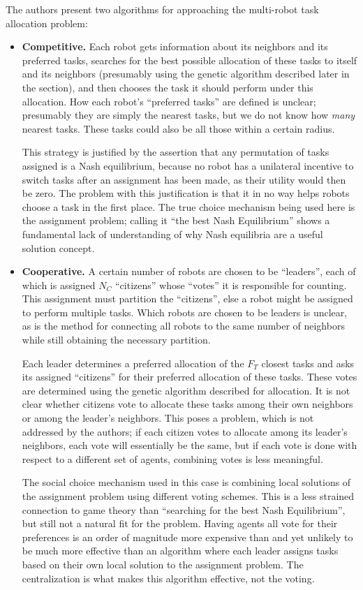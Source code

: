 \documentclass[11pt]{article}
\begin{document}
The authors present two algorithms for approaching the multi-robot task allocation problem:
\begin{flushleft}
\begin{itemize}
\item \textbf{Competitive.} Each robot gets information about its neighbors and its preferred tasks, searches for the best possible allocation of these tasks to itself and its neighbors (presumably using the genetic algorithm described later in the section), and then chooses the task it should perform under this allocation. How each robot's ``preferred tasks'' are defined is unclear; presumably they are simply the nearest tasks, but we do not know how \textit{many} nearest tasks. These tasks could also be all those within a certain radius. 

This strategy is justified by the assertion that any permutation of tasks assigned is a Nash equilibrium, because no robot has a unilateral incentive to switch tasks after an assignment has been made, as their utility would then be zero. The problem with this justification is that it in no way helps robots choose a task in the first place. The true choice mechanism being used here is the assignment problem; calling it ``the best Nash Equilibrium'' shows a fundamental lack of understanding of why Nash equilibria are a useful solution concept.

\item \textbf{Cooperative.} A certain number of robots are chosen to be ``leaders'', each of which is assigned $N_C$ ``citizens'' whose ``votes'' it is responsible for counting. This assignment must partition the ``citizens'', else a robot might be assigned to perform multiple tasks. Which robots are chosen to be leaders is unclear, as is the method for connecting all robots to the same number of neighbors while still obtaining the necessary partition. 

Each leader determines a preferred allocation of the $F_T$ closest tasks and asks its assigned ``citizens'' for their preferred allocation of these tasks. These votes are determined using the genetic algorithm described for allocation. It is not clear whether citizens vote to allocate these tasks among their own neighbors or among the leader's neighbors. This poses a problem, which is not addressed by the authors; if each citizen votes to allocate among its leader's neighbors, each vote will essentially be the same, but if each vote is done with respect to a different set of agents, combining votes is less meaningful.

The social choice mechanism used in this case is combining local solutions of the assignment problem using different voting schemes. This is a less strained connection to game theory than ``searching for the best Nash Equilibrium'', but still not a natural fit for the problem. Having agents all vote for their preferences is an order of magnitude more expensive than and yet unlikely to be much more effective than an algorithm where each leader assigns tasks based on their own local solution to the assignment problem. The centralization is what makes this algorithm effective, not the voting.
\end{itemize}
\end{flushleft}
\end{document}
